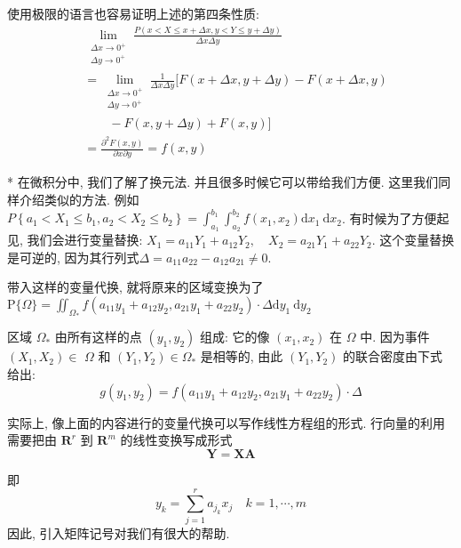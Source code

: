     使用极限的语言也容易证明上述的第四条性质: 
    $$
            \begin{aligned}
                 & \lim _{\substack{\Delta x \rightarrow 0^{+}                                                                 \\
                \Delta y \rightarrow 0^{+}}} \frac{P(x<X \leq x+\Delta x, y<Y \leq y+\Delta y)}{\Delta x \Delta y} \\
                 & = \lim _{\substack{\Delta x \rightarrow 0^{+}                                                               \\
                \Delta y \rightarrow 0^{+}}} \frac{1}{\Delta x \Delta y}[ F(x+\Delta x, y+\Delta y)-F(x+\Delta x, y)           \\
                 & \quad \quad  -F(x, y+\Delta y)+F(x, y)]                                                                     \\
                 & =\frac{\partial^2 F(x, y)}{\partial x \partial y}=f(x, y)
            \end{aligned}
        $$
  \begin{remark}
    * 在微积分中, 我们了解了换元法. 并且很多时候它可以带给我们方便. 这里我们同样介绍类似的方法. 例如${P}\left\{a_1<X_1 \leq b_1, a_2<X_2 \leq b_2\right\}=\int_{a_1}^{b_1} \int_{a_2}^{b_2} f\left(x_1, x_2\right) \mathrm{d} x_1 \mathrm{~d} x_2$. 有时候为了方便起见, 我们会进行变量替换: $X_1=a_{11} Y_1+a_{12} Y_2, \quad X_2=a_{21} Y_1+a_{22} Y_2$. 这个变量替换是可逆的, 因为其行列式$\Delta=a_{11} a_{22}-a_{12} a_{21}\neq 0$. 

    带入这样的变量代换, 就将原来的区域变换为了$\mathrm{P}\{\Omega\}=\iint_{\Omega_*} f\left(a_{11} y_1+a_{12} y_2, a_{21} y_1+a_{22} y_2\right) \cdot \Delta \mathrm{d} y_1 \mathrm{~d} y_2$

    区域 $\Omega_*$ 由所有这样的点 $\left(y_1, y_2\right)$ 组成: 它的像 $\left(x_1, x_2\right)$ 在 $\Omega$ 中. 因为事件 $\left(X_1, X_2\right) \in$ $\Omega$ 和 $\left(Y_1, Y_2\right) \in \Omega_*$ 是相等的, 由此 $\left(Y_1, Y_2\right)$ 的联合密度由下式给出:
$$
g\left(y_1, y_2\right)=f\left(a_{11} y_1+a_{12} y_2, a_{21} y_1+a_{22} y_2\right) \cdot \Delta
$$

实际上, 像上面的内容进行的变量代换可以写作线性方程组的形式. 
行向量的利用需要把由 $\mathbf{R}^r$ 到 $\mathbf{R}^m$ 的线性变换写成形式
$$
\boldsymbol{Y}=\boldsymbol{X} \boldsymbol{A}
$$

即
$$
y_k=\sum_{j=1}^r a_{j_k} x_j \quad k=1, \cdots, m
$$
因此, 引入矩阵记号对我们有很大的帮助. 
  \end{remark}

